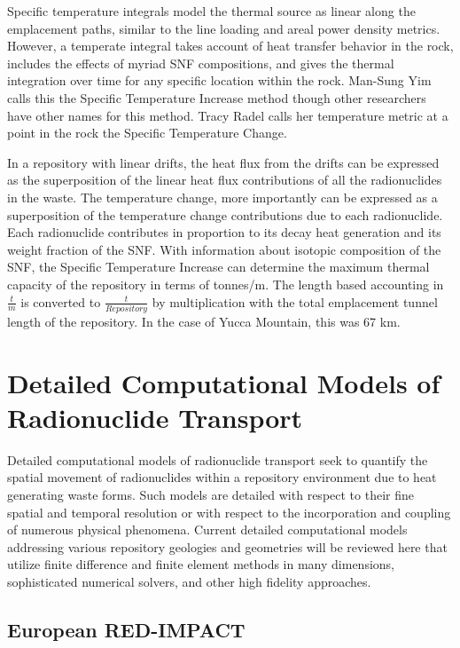Specific temperature integrals model the thermal source as linear along the
emplacement paths, similar to the line loading and areal power density metrics.
However, a temperate integral takes account of heat transfer behavior in the
rock, includes the effects of myriad SNF compositions, and gives the thermal
integration over time for any specific location within the rock.  Man-Sung Yim
calls this the Specific Temperature Increase method\cite{li_specific_2008}
though other researchers have other names for this method. Tracy Radel calls
her temperature metric at a point in the rock the Specific Temperature
Change\cite{radel_repository_2007}.

In a repository with linear drifts, the heat flux from the drifts can be
expressed as the superposition of the linear heat flux contributions of all the
radionuclides in the waste. The temperature change, more importantly can be 
expressed as a superposition of the temperature change contributions due to  
each radionuclide. Each radionuclide contributes in proportion to its
decay heat generation and its weight fraction of the SNF. With information
about isotopic composition of the SNF, the Specific Temperature Increase can
determine the maximum thermal capacity of the repository in terms of tonnes/m.
The length based accounting in $\frac{t}{m}$ is converted to
$\frac{t}{Repository}$ by multiplication with the total emplacement tunnel
length of the repository.  In the case of Yucca Mountain, this was 67 km.

\section{Detailed Computational Models of Radionuclide Transport}
\label{sec:detailed_radionuclide}

Detailed computational models of radionuclide transport seek to quantify the spatial 
movement of radionuclides within a repository environment due to heat 
generating waste forms. Such models are detailed with respect to their fine 
spatial and temporal resolution or with respect to the incorporation and 
coupling of numerous physical phenomena. Current detailed computational models 
addressing various repository geologies and geometries will be reviewed here 
that utilize finite difference and finite element methods in many dimensions, 
sophisticated numerical solvers, and other high fidelity approaches.


\subsection{European RED-IMPACT} 

